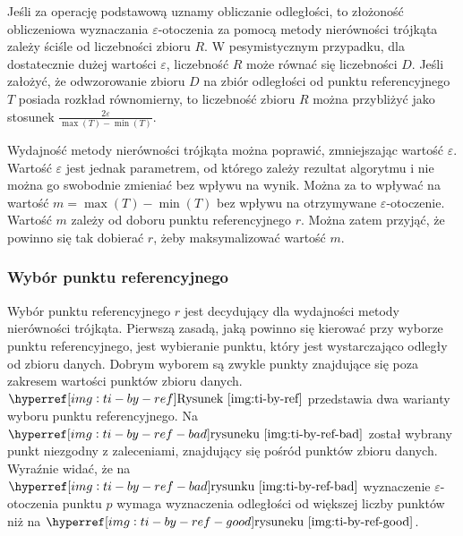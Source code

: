 Jeśli za operację podstawową uznamy obliczanie odległości, to złożoność obliczeniowa wyznaczania $ \varepsilon $-otoczenia za pomocą metody nierówności trójkąta zależy ściśle od liczebności zbioru $ R $. W pesymistycznym przypadku, dla dostatecznie dużej wartości $ \varepsilon $, liczebność $ R $ może równać się liczebności $ D $. Jeśli założyć, że odwzorowanie zbioru $ D $ na zbiór odległości od punktu referencyjnego $ T $ posiada rozkład równomierny, to liczebność zbioru $ R $ można przybliżyć jako stosunek $ \frac{2\varepsilon}{\max(T)-\min(T)} $. 

Wydajność metody nierówności trójkąta można poprawić, zmniejszając wartość $ \varepsilon $. Wartość $ \varepsilon $ jest jednak parametrem, od którego zależy rezultat algorytmu i nie można go swobodnie zmieniać bez wpływu na wynik. Można za to wpływać na wartość $ m=\max(T)-\min(T) $ bez wpływu na otrzymywane $ \varepsilon $-otoczenie. Wartość $ m $ zależy od doboru punktu referencyjnego $ r $. Można zatem przyjąć, że powinno się tak dobierać $ r $, żeby maksymalizować wartość $ m $. 

\subsubsection{Wybór punktu referencyjnego}
Wybór punktu referencyjnego  $ r $ jest decydujący dla wydajności metody nierówności trójkąta. Pierwszą zasadą, jaką powinno się kierować przy wyborze punktu referencyjnego, jest wybieranie punktu, który jest wystarczająco odległy od zbioru danych. Dobrym wyborem są zwykle punkty znajdujące się poza zakresem wartości punktów zbioru danych. $ \myhyperref{img:ti-by-ref}{Rysunek} $ przedstawia dwa warianty wyboru punktu referencyjnego. Na $ \myhyperref{img:ti-by-ref-bad}{rysuneku} $ został wybrany punkt niezgodny z zaleceniami, znajdujący się pośród punktów zbioru danych. Wyraźnie widać, że na $ \myhyperref{img:ti-by-ref-bad}{rysunku} $ wyznaczenie $ \varepsilon $-otoczenia punktu $ p $ wymaga wyznaczenia odległości od większej liczby punktów niż na $ \myhyperref{img:ti-by-ref-good}{rysuneku} $.

